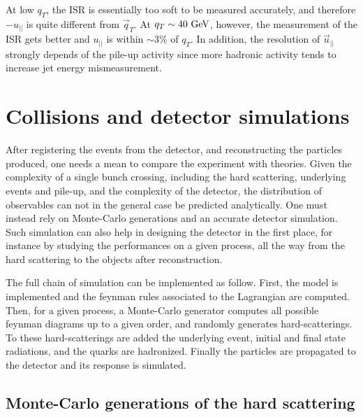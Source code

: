         At low $q_T$, the ISR is essentially too soft to be measured accurately, and
        therefore $- u_{||}$ is quite different from $\vec{q}_T$. At $q_T \sim 40~\text{GeV}$,
        however, the measurement of the ISR gets better and $u_{||}$ is within $\sim 3\%$
        of $q_T$. In addition, the resolution of $\vec{u}_{||}$ strongly depends of the
        pile-up activity since more hadronic activity tends to increase jet energy
        mismeasurement.

        \section{Collisions and detector simulations}

            After registering the events from the detector, and reconstructing the particles
            produced, one needs a mean to compare the experiment with theories. Given
            the complexity of a single bunch crossing, including the hard scattering,
            underlying events and pile-up, and the complexity of the detector, the distribution
            of observables can not in the general case be predicted analytically. One must
            instead rely on Monte-Carlo generations and an accurate detector simulation.
            Such simulation can also help in designing the detector in the first place, for
            instance by studying the performances on a given process, all the way
            from the hard scattering to the objects after reconstruction.

            The full chain of simulation can be implemented as follow. First, the model
            is implemented and the feynman rules associated to the Lagrangian are computed.
            Then, for a given process, a Monte-Carlo generator computes all possible
            feynman diagrams up to a given order, and randomly generates hard-scatterings.
            To these hard-scatterings are added the underlying event, initial and
            final state radiations, and the quarks are hadronized. Finally the particles
            are propagated to the detector and its response is simulated.

            \subsection{Monte-Carlo generations of the hard scattering}

